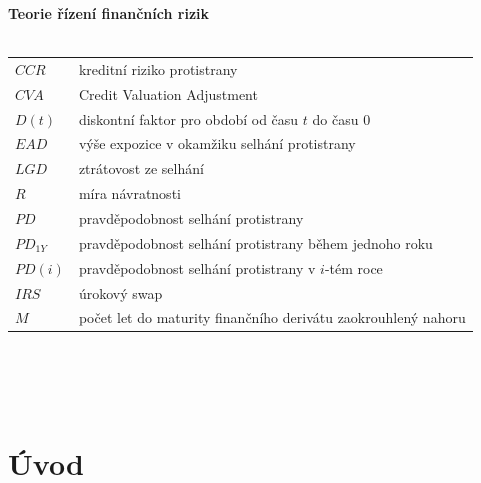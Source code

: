 \documentclass[a4paper,12pt]{report}
\theoremstyle{definition} \newtheorem{definice}[veta]{Definice}
\theoremstyle{remark}
\begin{document}
%
%
%
\newpage \noindent
\textbf{Teorie řízení finančních rizik}\\\\
   \begin{tabular}{p{4cm} p{9.3cm}}
   $CCR$ 								& kreditní riziko protistrany\\
   $CV\!A$								& Credit Valuation Adjustment\\
   $D(t)$								& diskontní faktor pro období od času $t$ do času 0\\
   $EAD$								& výše expozice v okamžiku selhání protistrany\\
   $LGD$								& ztrátovost ze selhání\\
   $R$									& míra návratnosti\\
   $PD$								& pravděpodobnost selhání protistrany\\
   $PD_{1Y}$								& pravděpodobnost selhání protistrany během jednoho roku\\
   $PD(i)$								& pravděpodobnost selhání protistrany v $i$-tém roce\\
   $IRS$								& úrokový swap\\
   $M$									& počet let do maturity finančního derivátu zaokrouhlený nahoru\\
\end{tabular}\\\\\\
%
%
%

\chapter*{Úvod} 
\pagestyle{plain}
\setcounter{page}{1}





\end{document}

